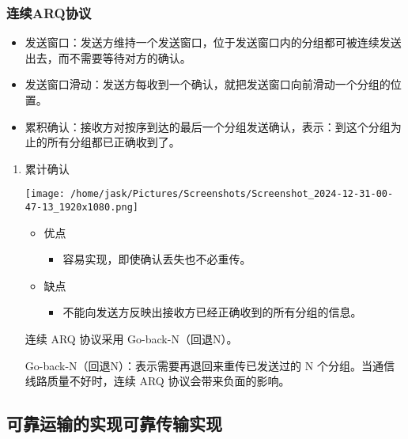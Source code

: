 \documentclass[11pt]{article}
\begin{document}
\subsubsection{连续ARQ协议}
\label{sec:org99dd7f9}
\begin{itemize}
\item 发送窗口：发送方维持一个发送窗口，位于发送窗口内的分组都可被连续发送出去，而不需要等待对方的确认。
\item 发送窗口滑动：发送方每收到一个确认，就把发送窗口向前滑动一个分组的位置。
\item 累积确认：接收方对按序到达的最后一个分组发送确认，表示：到这个分组为止的所有分组都已正确收到了。
\end{itemize}
\begin{enumerate}
\item 累计确认
\label{sec:org5295a44}
\begin{center}
\texttt{[image: /home/jask/Pictures/Screenshots/Screenshot\_2024-12-31-00-47-13\_1920x1080.png]}
\end{center}

\begin{itemize}
\item 优点
\begin{itemize}
\item 容易实现，即使确认丢失也不必重传。
\end{itemize}
\item 缺点
\begin{itemize}
\item 不能向发送方反映出接收方已经正确收到的所有分组的信息。
\end{itemize}
\end{itemize}

连续 ARQ 协议采用 Go-back-N（回退N）。

Go-back-N（回退N）：表示需要再退回来重传已发送过的 N 个分组。当通信线路质量不好时，连续 ARQ 协议会带来负面的影响。
\end{enumerate}
\subsection{可靠运输的实现\hfill{}\textsc{可靠传输实现}}
\label{sec:orgaae926d}
\end{document}
